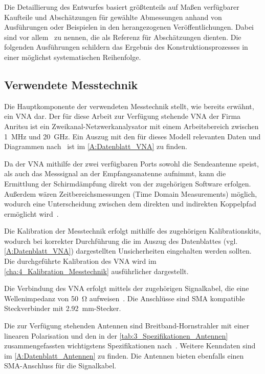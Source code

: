 
Die Detaillierung des Entwurfes basiert größtenteils auf Maßen verfügbarer Kaufteile und Abschätzungen für gewählte Abmessungen anhand von Ausführungen oder Beispielen in den herangezogenen Veröffentlichungen. Dabei sind vor allem~\cite{Design_of_shielded_enclosures, EMV-gerechtes_Geraetedesign, EM_Schirmung, Simplified_shielding, Handbook_Shielding_Materials_and_Performance} zu nennen, die als Referenz für Abschätzungen dienten. Die folgenden Ausführungen schildern das Ergebnis des Konstruktionsprozesses in einer möglichst systematischen Reihenfolge.

\subsection{Verwendete Messtechnik}

Die Hauptkomponente der verwendeten Messtechnik stellt, wie bereits erwähnt, ein \ac{VNA} dar. Der für diese Arbeit zur Verfügung stehende \ac{VNA} der Firma Anritsu ist ein Zweikanal-Netzwerkanalysator mit einem Arbeitsbereich zwischen \SI{1}{\mega\hertz} und \SI{20}{\giga\hertz}. Ein Auszug mit den für dieses Modell relevanten Daten und Diagrammen nach~\cite{VNA-Datenblatt} ist im \Anhang\ref{A:Datenblatt_VNA} zu finden. 
\par
\vspace{\linespace}
Da der \ac{VNA} mithilfe der zwei verfügbaren Ports sowohl die Sendeantenne speist, als auch das Messsignal an der Empfangsanatenne aufnimmt, kann die Ermittlung der Schirmdämpfung direkt von der zugehörigen Software erfolgen. Außerdem wären Zeitbereichsmessungen (Time Domain Measurements) möglich, wodurch eine Unterscheidung zwischen dem direkten und indirekten Koppelpfad ermöglicht wird~\cite{Techniques_Shielding_Effectiveness_Far_Field_Simulation}. %
\par
\vspace{\linespace}
Die Kalibration der Messtechnik erfolgt mithilfe des zugehörigen Kalibrationskits, wodurch bei korrekter Durchführung die im Auszug des Datenblattes (vgl. \Anhang\ref{A:Datenblatt_VNA}) dargestellten Unsicherheiten eingehalten werden sollten. Die durchgeführte Kalibration des \ac{VNA} wird im \Abschnitt\ref{cha:4_Kalibration_Messtechnik} ausführlicher dargestellt.
\par
\vspace{\linespace}
Die Verbindung des \ac{VNA} erfolgt mittels der zugehörigen Signalkabel, die eine Wellenimpedanz von \SI{50}{\ohm} aufweisen~\cite{Testkabel_VNA-Datenblatt}. Die Anschlüsse sind \ac{SMA} kompatible Steckverbinder mit \SI{2,92}{\milli\meter}-Stecker.
\par
\vspace{\linespace}
Die zur Verfügung stehenden Antennen sind Breitband-Hornstrahler mit einer linearen Polarisation und den in der \Tabelle\ref{tab:3_Spezifikationen_Antennen} zusammengefassten wichtigstens Spezifikationen nach~\cite{Antennen-Datenblatt}. Weitere Kenndaten sind im \Anhang\ref{A:Datenblatt_Antennen} zu finden. Die Antennen bieten ebenfalls einen SMA-Anschluss für die Signalkabel.

